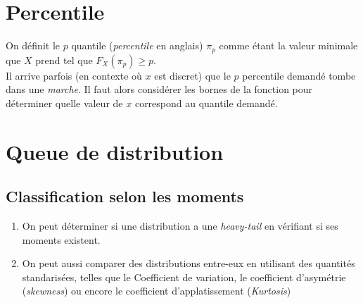 \documentclass[12pt, french]{report}
\begin{document}
\setcounter{section}{3}
%
%
%

\section{Percentile}
\label{sec:percentile}
On définit le $p$ quantile (\emph{percentile} en anglais) $\pi_p$ comme étant la valeur minimale que $X$ prend tel que $F_X(\pi_p) \geq p$. \\

Il arrive parfois (en contexte où $x$  est discret) que le $p$ percentile demandé tombe dans une \emph{marche}. Il faut alors considérer les bornes de la fonction pour déterminer quelle valeur de $x$ correspond au quantile demandé.


\section{Queue de distribution}
\subsection{Classification selon les moments}
\begin{enumerate}[label=\faAngleRight]
\item On peut déterminer si une distribution a une \textit{heavy-tail} en vérifiant si ses moments existent.

\item On peut aussi comparer des distributions entre-eux en utilisant des quantités standarisées, telles que le Coefficient de variation, le coefficient d'asymétrie (\textit{skewness}) ou encore le coefficient d'applatissement (\textit{Kurtosis})
\end{enumerate}
\end{document}
